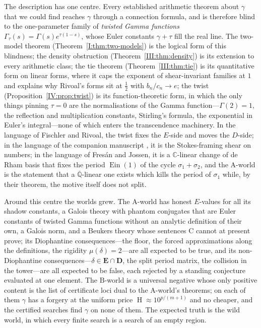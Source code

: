 \documentclass[11pt,a4paper]{article}
\newcommand{\C}{\mathbb C}
\newcommand{\Qbar}{\overline{\mathbb Q}}
\newcommand{\Ein}{\operatorname{Ein}}
\newcommand{\EE}{\mathbf E}
\newcommand{\DD}{\mathbf D}
\DeclareMathOperator{\Ht}{H}
\theoremstyle{definition}
\theoremstyle{remark}
\numberwithin{equation}{section}
\begin{document}
The description has one centre. Every established arithmetic theorem about $\gamma$ that
we could find reaches $\gamma$ through a connection formula, and is therefore blind to the
one-parameter family of \emph{twisted Gamma functions} $\Gamma_\tau(s)=\Gamma(s)e^{\tau(1-s)}$,
whose Euler constants $\gamma+\tau$ fill the real line. The two-model theorem
(Theorem~\ref{I:thm:two-models}) is the logical form of this blindness; the density
obstruction (Theorem~\ref{III:thm:density}) is its extension to every arithmetic class;
the tie theorem (Theorem~\ref{III:thm:tie}) is its quantitative form on linear forms,
where it caps the exponent of shear-invariant families at $1$ and explains why Rivoal's
forms sit at $\tfrac12$ with $b_n/c_n\to e$; the twist (Proposition~\ref{IV:prop:twist})
is its function-theoretic form, in which the only things pinning $\tau=0$ are the
normalisations of the Gamma function---$\Gamma(2)=1$, the reflection and multiplication
constants, Stirling's formula, the exponential in Euler's integral---none of which enters
the transcendence machinery. In the language of Fischler and Rivoal, the twist fixes the
$E$-side and moves the $D$-side; in the language of the companion manuscript \cite{K002},
it is the Stokes-framing shear on numbers; in the language of Fres\'an and Jossen, it is
a $\C$-linear change of de Rham basis that fixes the period $\Ein(1)$ of the cycle
$\sigma_1+\sigma_2$, and the $\mathrm A$-world is the statement that a $\Qbar$-linear one
exists which kills the period of $\sigma_1$ while, by their theorem, the motive itself
does not split.

Around this centre the worlds grew. The $\mathrm A$-world has honest $E$-values for all
its shadow constants, a Galois theory with phantom conjugates that are Euler constants of
twisted Gamma functions without an analytic definition of their own, a Galois norm, and
a Beukers theory whose sentences $\mathrm C$ cannot at present prove; its Diophantine
consequences---the floor, the forced approximations along the definitions, the rigidity
$\mu(\delta)=2$---are all expected to be true, and its non-Diophantine
consequences---$\delta\in\EE\cap\DD$, the split period matrix, the collision in the
tower---are all expected to be false, each rejected by a standing conjecture evaluated at
one element. The $\mathrm B$-world is a universal negative whose only positive content
is the list of certificate loci dual to the $\mathrm A$-world's theorems; on each of them
$\gamma$ has a forgery at the uniform price $\Ht\approx10^{p/(m+1)}$ and no cheaper, and
the certified searches find $\gamma$ on none of them. The expected truth is the wild
world, in which every finite search is a search of an empty region.
\end{document}
